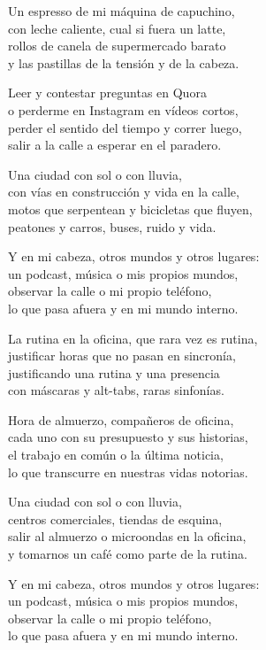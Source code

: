 \begin{lyrics}
Un espresso de mi máquina de capuchino,\\
con leche caliente, cual si fuera un latte,\\
rollos de canela de supermercado barato\\
y las pastillas de la tensión y de la cabeza.

Leer y contestar preguntas en Quora\\
o perderme en Instagram en vídeos cortos,\\
perder el sentido del tiempo y correr luego,\\
salir a la calle a esperar en el paradero.

Una ciudad con sol o con lluvia,\\
con vías en construcción y vida en la calle,\\
motos que serpentean y bicicletas que fluyen,\\
peatones y carros, buses, ruido y vida.

Y en mi cabeza, otros mundos y otros lugares:\\
un podcast, música o mis propios mundos,\\
observar la calle o mi propio teléfono,\\
lo que pasa afuera y en mi mundo interno.

La rutina en la oficina, que rara vez es rutina,\\
justificar horas que no pasan en sincronía,\\
justificando una rutina y una presencia\\
con máscaras y alt-tabs, raras sinfonías.

Hora de almuerzo, compañeros de oficina,\\
cada uno con su presupuesto y sus historias,\\
el trabajo en común o la última noticia,\\
lo que transcurre en nuestras vidas notorias.

Una ciudad con sol o con lluvia,\\
centros comerciales, tiendas de esquina,\\
salir al almuerzo o microondas en la oficina,\\
y tomarnos un café como parte de la rutina.

Y en mi cabeza, otros mundos y otros lugares:\\
un podcast, música o mis propios mundos,\\
observar la calle o mi propio teléfono,\\
lo que pasa afuera y en mi mundo interno.


\end{lyrics}

